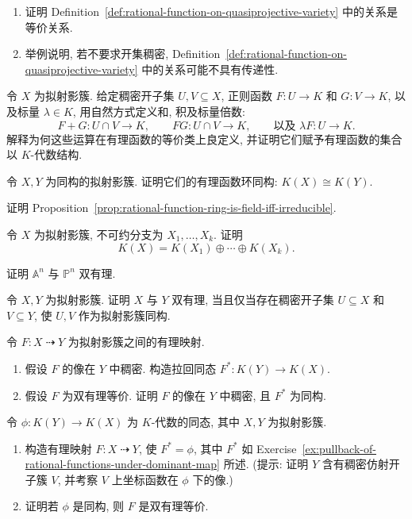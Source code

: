 \BookExerciseHeading
\begin{BookExercises}
  \item\label{ex:dense-open-rational-function-equivalence-relation}
  \begin{enumerate}
    \item 证明 Definition~\ref{def:rational-function-on-quasiprojective-variety} 中的关系是等价关系.
    \item 举例说明, 若不要求开集稠密, Definition~\ref{def:rational-function-on-quasiprojective-variety} 中的关系可能不具有传递性.
  \end{enumerate}
  \item\label{ex:rational-functions-form-algebra} 令 $X$ 为拟射影簇. 给定稠密开子集 $U,V\subseteq X$, 正则函数 $F:U\to K$ 和 $G:V\to K$, 以及标量 $\lambda\in K$, 用自然方式定义和, 积及标量倍数:
  \[
    F+G:U\cap V\to K,\qquad FG:U\cap V\to K,\qquad
    \text{以及 }\lambda F:U\to K.
  \]
  解释为何这些运算在有理函数的等价类上良定义, 并证明它们赋予有理函数的集合以 $K$-代数结构.
  \item\label{ex:rational-function-rings-invariant-under-isomorphism} 令 $X,Y$ 为同构的拟射影簇. 证明它们的有理函数环同构: $K(X)\cong K(Y)$.
  \item\label{ex:prove-rational-function-ring-is-field-criterion} 证明 Proposition~\ref{prop:rational-function-ring-is-field-iff-irreducible}.
  \item\label{ex:rational-function-ring-splits-over-irreducible-components} 令 $X$ 为拟射影簇, 不可约分支为 $X_{1},\ldots,X_{k}$. 证明
  \[
    K(X)=K(X_{1})\oplus\cdots\oplus K(X_{k}).
  \]
  \item\label{ex:affine-space-birational-to-projective-space} 证明 $\mathbb{A}^{n}$ 与 $\mathbb{P}^{n}$ 双有理.
  \item\label{ex:birational-equivalence-iff-dense-open-isomorphism} 令 $X,Y$ 为拟射影簇. 证明 $X$ 与 $Y$ 双有理, 当且仅当存在稠密开子集 $U\subseteq X$ 和 $V\subseteq Y$, 使 $U,V$ 作为拟射影簇同构.
  \item\label{ex:pullback-of-rational-functions-under-dominant-map} 令 $F:X\mathrel{\rightdasharrow} Y$ 为拟射影簇之间的有理映射.
  \begin{enumerate}
    \item 假设 $F$ 的像在 $Y$ 中稠密. 构造拉回同态 $F^{*}:K(Y)\to K(X)$.
    \item 假设 $F$ 为双有理等价. 证明 $F$ 的像在 $Y$ 中稠密, 且 $F^{*}$ 为同构.
  \end{enumerate}
  \item\label{ex:construct-rational-map-from-function-ring-homomorphism} 令 $\phi:K(Y)\to K(X)$ 为 $K$-代数的同态, 其中 $X,Y$ 为拟射影簇.
  \begin{enumerate}
    \item 构造有理映射 $F:X\mathrel{\rightdasharrow} Y$, 使 $F^{*}=\phi$, 其中 $F^{*}$ 如 Exercise~\ref{ex:pullback-of-rational-functions-under-dominant-map} 所述. (提示: 证明 $Y$ 含有稠密仿射开子簇 $V$, 并考察 $V$ 上坐标函数在 $\phi$ 下的像.)
    \item 证明若 $\phi$ 是同构, 则 $F$ 是双有理等价.
  \end{enumerate}
\end{BookExercises}
